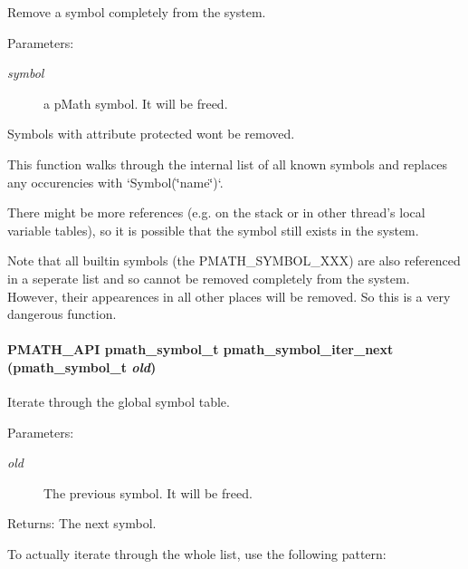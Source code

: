Remove a symbol completely from the system. 

\begin{Desc}
\item[Parameters:]
\begin{description}
\item[{\em symbol}]a pMath symbol. It will be freed.\end{description}
\end{Desc}
Symbols with attribute protected wont be removed.

This function walks through the internal list of all known symbols and replaces any occurencies with `Symbol(\char`\"{}name\char`\"{})`.

There might be more references (e.g. on the stack or in other thread's local variable tables), so it is possible that the symbol still exists in the system.

Note that all builtin symbols (the PMATH\_\-SYMBOL\_\-XXX) are also referenced in a seperate list and so cannot be removed completely from the system. However, their appearences in all other places will be removed. So this is a very dangerous function. \hypertarget{group__symbols_gaa4869d454bc3a544a5333e58381f760}{
\paragraph[{pmath\_\-symbol\_\-iter\_\-next}]{\setlength{\rightskip}{0pt plus 5cm}PMATH\_\-API {\bf pmath\_\-symbol\_\-t} pmath\_\-symbol\_\-iter\_\-next ({\bf pmath\_\-symbol\_\-t} {\em old})}\hfill}
\label{group__symbols_gaa4869d454bc3a544a5333e58381f760}


Iterate through the global symbol table. 

\begin{Desc}
\item[Parameters:]
\begin{description}
\item[{\em old}]The previous symbol. It will be freed. \end{description}
\end{Desc}
\begin{Desc}
\item[Returns:]The next symbol.\end{Desc}
To actually iterate through the whole list, use the following pattern: 

